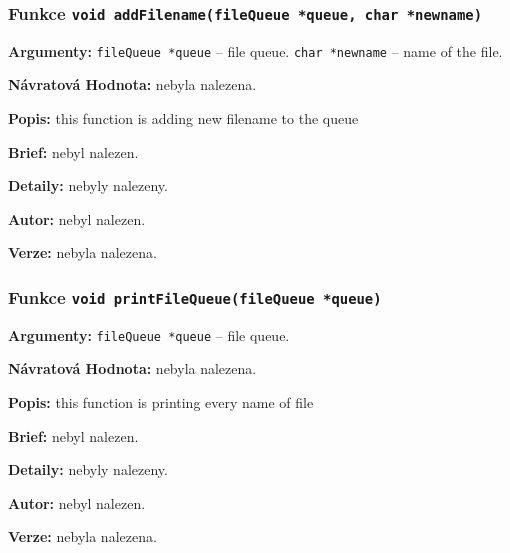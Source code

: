 \documentclass[12pt, a4paper]{article}
\begin{document}
\subsubsection{Funkce \texttt{void addFilename(fileQueue *queue, char *newname)}}
\textbf{Argumenty: }\verb"fileQueue *queue" -- file queue. \verb"char *newname" -- name of the file. \\
\par\noindent
\textbf{Návratová Hodnota: }nebyla nalezena.\\
\par\noindent
\textbf{Popis: }this function is adding new filename to the queue\\
\par\noindent
\textbf{Brief: }nebyl nalezen.\\
\par\noindent
\textbf{Detaily: }nebyly nalezeny.\\
\par\noindent
\textbf{Autor: }nebyl nalezen.\\
\par\noindent
\textbf{Verze: }nebyla nalezena.\\
\par\noindent
\subsubsection{Funkce \texttt{void printFileQueue(fileQueue *queue)}}
\textbf{Argumenty: }\verb"fileQueue *queue" -- file queue. \\
\par\noindent
\textbf{Návratová Hodnota: }nebyla nalezena.\\
\par\noindent
\textbf{Popis: }this function is printing every name of file\\
\par\noindent
\textbf{Brief: }nebyl nalezen.\\
\par\noindent
\textbf{Detaily: }nebyly nalezeny.\\
\par\noindent
\textbf{Autor: }nebyl nalezen.\\
\par\noindent
\textbf{Verze: }nebyla nalezena.\\
\par\noindent
\end{document}
